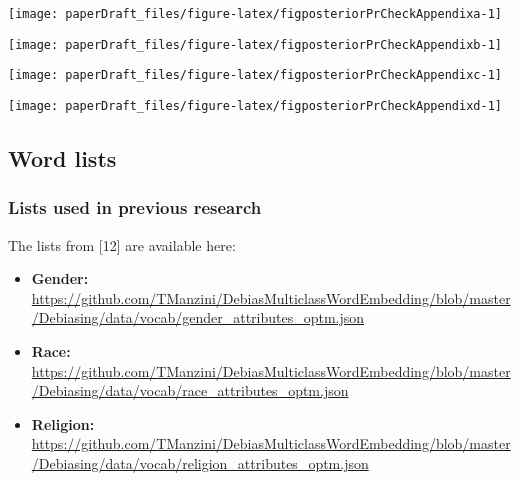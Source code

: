 \documentclass[
  12pt,
  dvipsnames,enabledeprecatedfontcommands]{scrartcl}
\begin{document}
\label{appendix:posterior}

\begin{center}\texttt{[image: paperDraft\_files/figure-latex/figposteriorPrCheckAppendixa-1]} \end{center}

\begin{center}\texttt{[image: paperDraft\_files/figure-latex/figposteriorPrCheckAppendixb-1]} \end{center}

\begin{center}\texttt{[image: paperDraft\_files/figure-latex/figposteriorPrCheckAppendixc-1]} \end{center}

\begin{center}\texttt{[image: paperDraft\_files/figure-latex/figposteriorPrCheckAppendixd-1]} \end{center}

\hypertarget{word-lists}{%
\subsection{Word lists}\label{word-lists}}

\label{appendix:word}

\hypertarget{lists-used-in-previous-research}{%
\subsubsection{Lists used in previous
research}\label{lists-used-in-previous-research}}

\label{appendix:manzini_word_lists} The lists from {[}12{]} are
available here:

\begin{itemize}
\item
  \textbf{Gender:}
  \url{https://github.com/TManzini/DebiasMulticlassWordEmbedding/blob/master/Debiasing/data/vocab/gender_attributes_optm.json}
\item
  \textbf{Race:}
  \url{https://github.com/TManzini/DebiasMulticlassWordEmbedding/blob/master/Debiasing/data/vocab/race_attributes_optm.json}
\item
  \textbf{Religion:}
  \url{https://github.com/TManzini/DebiasMulticlassWordEmbedding/blob/master/Debiasing/data/vocab/religion_attributes_optm.json}
\end{itemize}
\end{document}
